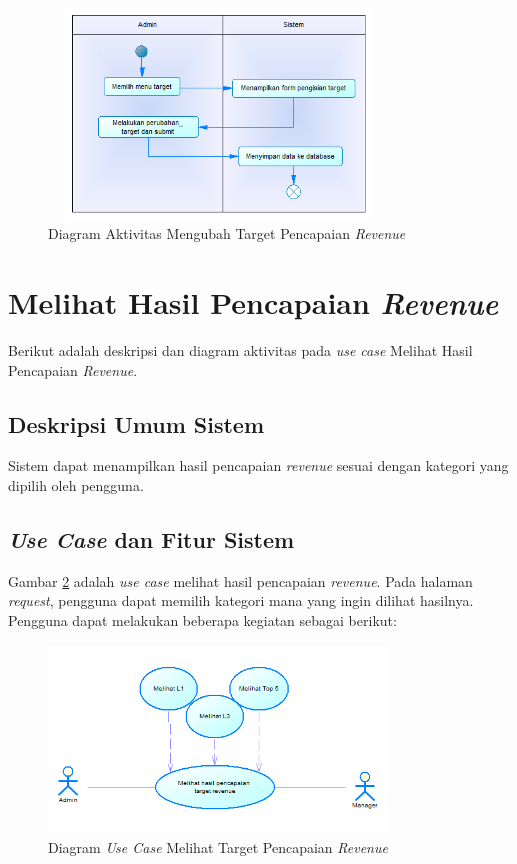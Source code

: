 	\begin{figure}[h]
	\centerline {\includegraphics[width=9cm,height=5.6cm]{bab4/activity_mengubah_target_pencapaian_revenue.png}}
	\caption{Diagram Aktivitas Mengubah Target Pencapaian \textit{Revenue}}
	\label{figure:activity_mengubah_target_pencapaian_revenue}
	\end{figure}
		
\section{Melihat Hasil Pencapaian \textit{Revenue}}
Berikut adalah deskripsi dan diagram aktivitas pada \textit{use case} Melihat Hasil Pencapaian \textit{Revenue}.

\subsection{Deskripsi Umum Sistem}
\tab Sistem dapat menampilkan hasil pencapaian \textit{revenue} sesuai dengan kategori yang dipilih oleh pengguna.

\subsection{\textit{Use Case} dan Fitur Sistem}
Gambar \ref{figure:use_case_melihat_hasil_pencapaian_revenue} adalah \textit{use case} melihat hasil pencapaian \textit{revenue}. Pada halaman \textit{request}, pengguna dapat memilih kategori mana yang ingin dilihat hasilnya. Pengguna dapat melakukan beberapa kegiatan sebagai berikut:

	\begin{figure}[h!]
		\centerline
		{\includegraphics[width=9cm,height=5cm]{bab4/use_case_melihat_target_pencapaian_revenue.png}}
		\caption{Diagram \textit{Use Case} Melihat Target Pencapaian \textit{Revenue}}
		\label{figure:use_case_melihat_hasil_pencapaian_revenue}
	\end{figure}
	
